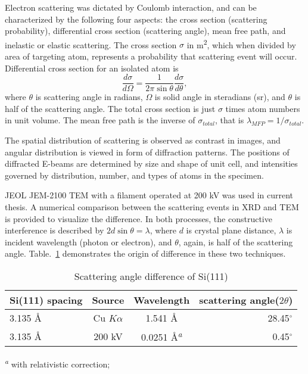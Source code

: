 Electron scattering was dictated by Coulomb interaction, and can be characterized by the following four aspects: the cross section (scattering probability), differential cross section (scattering angle), mean free path, and inelastic or elastic scattering. The cross section $\sigma$ in \si{m^2}, which when divided by area of targeting atom, represents a probability that scattering event will occur. Differential cross section for an isolated atom is 
\[
\frac{d\sigma}{d\Omega} = \frac{1}{2\pi \sin\theta} \frac{d\sigma}{d\theta},
\] 
where $\theta$ is scattering angle in radians, $\Omega$ is solid angle in steradians (sr), and $\theta$ is half of the scattering angle. The total cross section is just $\sigma$ times atom numbers in unit volume. The mean free path is the inverse of $\sigma_{total}$, that is $\lambda_{MFP} = 1/\sigma_{total}$. 

The spatial distribution of scattering is observed as contrast in images, and angular distribution is viewed in form of diffraction patterns. The positions of diffracted E-beams are determined by size and shape of unit cell, and intensities governed by distribution, number, and types of atoms in the specimen. 

JEOL JEM-2100 TEM with a  filament operated at 200 kV was used in current thesis. A numerical comparison between the scattering events in XRD and TEM is provided to visualize the difference. In both processes, the constructive interference is described by $2d\sin\theta = \lambda$, where $d$ is crystal plane distance, $\lambda$ is incident wavelength (photon or electron), and $\theta$, again, is half of the scattering angle. Table.~\ref{tab:ch2tem} demonstrates the origin of difference in these two techniques. 

\begin{table}[htb]
\centering
\caption{Scattering angle difference of Si(111)}\label{tab:ch2tem}
\begin{tabular}{lccr}
\toprule
Si(111) spacing & Source & Wavelength & scattering angle($2\theta$) \\
\midrule
3.135 \AA & Cu $K\alpha$ & 1.541 \AA & 28.45$^\circ$  \\
3.135 \AA & 200 kV & 0.0251 \AA \textsuperscript{\emph{a}}& 0.45$^\circ$  \\
\bottomrule
\end{tabular}

 \textsuperscript{\emph{a}} with relativistic correction;
\end{table}

